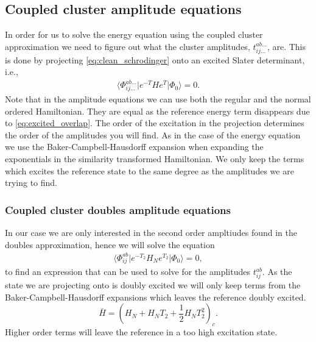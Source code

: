 \documentclass[
    a4paper, aps, twocolumn, floatfix, superscriptaddress,
    nofootinbib]{revtex4-1}
\newcommand{\1}{\mathds{1}}
\newcommand{\para}[1]{\left(#1\right)}
\newcommand{\bra}[1]{\langle #1\lvert}
\newcommand{\ket}[1]{\rvert #1\rangle}
\newcommand{\kslat}{\ket{\Phi_0}}
\begin{document}
    \subsection{Coupled cluster amplitude equations}
        In order for us to solve the energy equation using the coupled cluster
        approximation we need to figure out what the cluster amplitudes,
        $t_{ij\dots}^{ab\dots}$, are. This is done by projecting
        \autoref{eq:clean_schrodinger} onto an excited Slater determinant, i.e.,
        \begin{align}
            \bra{\Phi_{ij\dots}^{ab\dots}}e^{-T}He^{T}\kslat
            = 0.
        \end{align}
        Note that in the amplitude equations we can use both the regular and the
        normal ordered Hamiltonian. They are equal as the reference energy term
        disappears due to \autoref{eq:excited_overlap}. The order of the
        excitation in the projection determines the order of the amplitudes you
        will find. As in the case of the energy equation we use the
        Baker-Campbell-Hausdorff expansion when expanding the exponentials in
        the similarity transformed Hamiltonian. We only keep the terms which
        excites the reference state to the same degree as the amplitudes we are
        trying to find.

        \subsubsection{Coupled cluster doubles amplitude equations}
            In our case we are only interested in the second order ampltiudes
            found in the doubles approximation, hence we will solve the equation
            \begin{align}
                \bra{\Phi_{ij}^{ab}}e^{-T_2}H_N e^{T_2}\kslat = 0,
                \label{eq:doubles_amplitude_1}
            \end{align}
            to find an expression that can be used to solve for the amplitudes
            $t_{ij}^{ab}$. As the state we are projecting onto is doubly excited
            we will only keep terms from the Baker-Campbell-Hausdorff expansions
            which leaves the reference doubly excited.
            \begin{equation}
                \bar{H} = \para{
                    H_N + H_NT_2 + \frac{1}{2}H_NT_2^2
                }_c.
                \label{eq:normal_order_expansion}
            \end{equation}
            Higher order terms will leave the reference in a too high excitation
            state.
\end{document}
